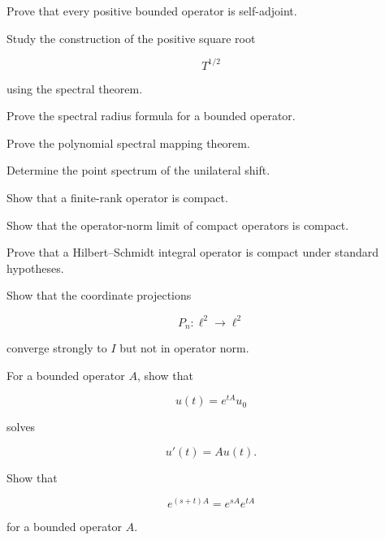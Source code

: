 \begin{exercise}[3]
Prove that every positive bounded operator is self-adjoint.
\end{exercise}

\begin{exercise}[3]
Study the construction of the positive square root

\[
T^{1/2}
\]

using the spectral theorem.
\end{exercise}

\begin{exercise}[3]
Prove the spectral radius formula for a bounded operator.
\end{exercise}

\begin{exercise}[3]
Prove the polynomial spectral mapping theorem.
\end{exercise}

\begin{exercise}[3]
Determine the point spectrum of the unilateral shift.
\end{exercise}

\begin{exercise}[3]
Show that a finite-rank operator is compact.
\end{exercise}

\begin{exercise}[3]
Show that the operator-norm limit of compact operators is compact.
\end{exercise}

\begin{exercise}[3]
Prove that a Hilbert--Schmidt integral operator is compact under standard
hypotheses.
\end{exercise}

\begin{exercise}[3]
Show that the coordinate projections

\[
P_n:\ell^2\to\ell^2
\]

converge strongly to \(I\) but not in operator norm.
\end{exercise}

\begin{exercise}[3]
For a bounded operator \(A\), show that

\[
u(t)=e^{tA}u_0
\]

solves

\[
u'(t)=Au(t).
\]
\end{exercise}

\begin{exercise}[3]
Show that

\[
e^{(s+t)A}
=
e^{sA}e^{tA}
\]

for a bounded operator \(A\).
\end{exercise}

